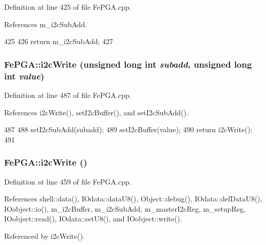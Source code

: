 Definition at line 425 of file FePGA.cpp.

References m\_\-i2cSubAdd.


\begin{DoxyCode}
425                                   {
426   return m_i2cSubAdd; 
427 }
\end{DoxyCode}
\hypertarget{classFePGA_a45e1cfdf1f303f3958bf6a83c4e8039b}{
\subsubsection[{i2cWrite}]{ FePGA::i2cWrite (unsigned long int {\em subadd}, \/  unsigned long int {\em value})}}
\label{classFePGA_a45e1cfdf1f303f3958bf6a83c4e8039b}


Definition at line 487 of file FePGA.cpp.

References i2cWrite(), setI2cBuffer(), and setI2cSubAdd().


\begin{DoxyCode}
487                                                                            {
488   setI2cSubAdd(subadd);
489   setI2cBuffer(value);
490   return i2cWrite();
491 }
\end{DoxyCode}
\hypertarget{classFePGA_a27b9c9bb486cea35b1bbcac5da96f527}{
\subsubsection[{i2cWrite}]{ FePGA::i2cWrite ()}}
\label{classFePGA_a27b9c9bb486cea35b1bbcac5da96f527}


Definition at line 459 of file FePGA.cpp.

References shell::data(), IOdata::dataU8(), Object::debug(), IOdata::defDataU8(), IOobject::io(), m\_\-i2cBuffer, m\_\-i2cSubAdd, m\_\-masterI2cReg, m\_\-setupReg, IOobject::read(), IOdata::setU8(), and IOobject::write().

Referenced by i2cWrite().


